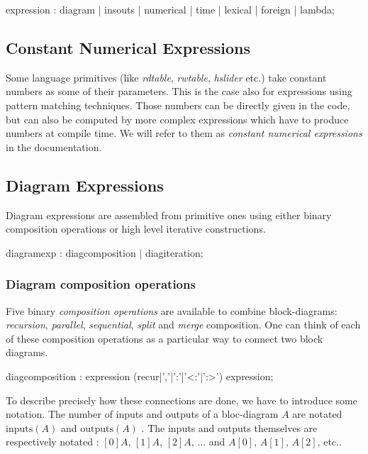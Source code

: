 \begin{rail}
expression : diagram | insouts | numerical | time | lexical | foreign | lambda;
\end{rail}

\subsection{Constant Numerical Expressions}

Some language primitives (like \textit{rdtable}, \textit{rwtable}, \textit{hslider} etc.) take constant numbers as some of their parameters. This is the case also for expressions using pattern matching techniques. Those numbers can be directly given in the code, but can also be computed by more complex expressions which have to produce numbers at compile time. We will refer to them as \textit{constant numerical expressions} in the documentation.

\subsection{Diagram Expressions}

Diagram expressions are assembled from primitive ones using either binary composition operations or high level iterative constructions.
 
\begin{rail}
diagramexp : diagcomposition | diagiteration;
\end{rail}

\subsubsection{Diagram composition operations} 
Five binary \emph{composition operations} are available to combine block-diagrams: \textit{recursion}, \textit{parallel}, \textit{sequential}, \textit{split} and \textit{merge} composition. One can think of each of these composition operations as a particular way to connect two block diagrams. 

\begin{rail}
diagcomposition : expression (recur|','|':'|'<:'|':>') expression;
\end{rail}

To describe precisely how these connections are done, we have to introduce some notation.  The number of inputs and outputs of a bloc-diagram $A$ are notated $\mathrm{inputs}(A)$ and $\mathrm{outputs}(A)$ . The inputs and outputs themselves are respectively notated : $[0]A$, $[1]A$, $[2]A$, $\ldots$ and $A[0]$, $A[1]$, $A[2]$, etc.. 

